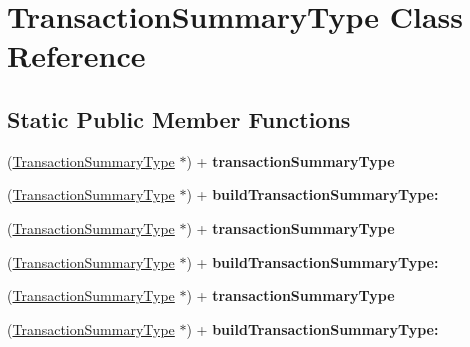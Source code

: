 \hypertarget{interface_transaction_summary_type}{
\section{TransactionSummaryType Class Reference}
\label{interface_transaction_summary_type}
}
\subsection*{Static Public Member Functions}
\begin{DoxyCompactItemize}
\item 
\hypertarget{interface_transaction_summary_type_aad22711c9768e3e7d9dd2017a0d8bd46}{
(\hyperlink{interface_transaction_summary_type}{TransactionSummaryType} $\ast$) + {\bfseries transactionSummaryType}}
\label{interface_transaction_summary_type_aad22711c9768e3e7d9dd2017a0d8bd46}

\item 
\hypertarget{interface_transaction_summary_type_a66b7ea29cbcd53ca74aa4706386921e7}{
(\hyperlink{interface_transaction_summary_type}{TransactionSummaryType} $\ast$) + {\bfseries buildTransactionSummaryType:}}
\label{interface_transaction_summary_type_a66b7ea29cbcd53ca74aa4706386921e7}

\item 
\hypertarget{interface_transaction_summary_type_aad22711c9768e3e7d9dd2017a0d8bd46}{
(\hyperlink{interface_transaction_summary_type}{TransactionSummaryType} $\ast$) + {\bfseries transactionSummaryType}}
\label{interface_transaction_summary_type_aad22711c9768e3e7d9dd2017a0d8bd46}

\item 
\hypertarget{interface_transaction_summary_type_a66b7ea29cbcd53ca74aa4706386921e7}{
(\hyperlink{interface_transaction_summary_type}{TransactionSummaryType} $\ast$) + {\bfseries buildTransactionSummaryType:}}
\label{interface_transaction_summary_type_a66b7ea29cbcd53ca74aa4706386921e7}

\item 
\hypertarget{interface_transaction_summary_type_aad22711c9768e3e7d9dd2017a0d8bd46}{
(\hyperlink{interface_transaction_summary_type}{TransactionSummaryType} $\ast$) + {\bfseries transactionSummaryType}}
\label{interface_transaction_summary_type_aad22711c9768e3e7d9dd2017a0d8bd46}

\item 
\hypertarget{interface_transaction_summary_type_a66b7ea29cbcd53ca74aa4706386921e7}{
(\hyperlink{interface_transaction_summary_type}{TransactionSummaryType} $\ast$) + {\bfseries buildTransactionSummaryType:}}
\label{interface_transaction_summary_type_a66b7ea29cbcd53ca74aa4706386921e7}

\end{DoxyCompactItemize}
